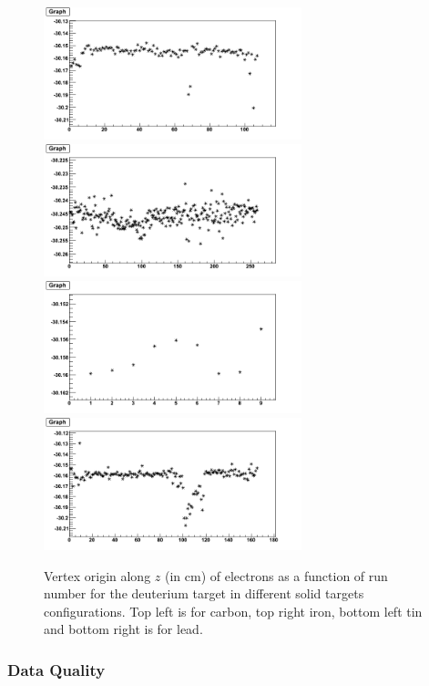 \begin{figure}[tbp]
\centering
\includegraphics[width=7.5cm] {answer-fig/VertexDeutC.png} 
\includegraphics[width=7.5cm] {answer-fig/VertexDeutFe.png} 
\includegraphics[width=7.5cm] {answer-fig/VertexDeutSn.png} 
\includegraphics[width=7.5cm] {answer-fig/VertexDeutPb.png} 
\caption {Vertex origin along $z$ (in cm) of electrons as a function of run 
number for the deuterium target in different solid targets configurations.
Top left is for carbon, top right iron, bottom left tin and bottom right is for lead.}
\label{VertexLiquid}
\end{figure}

\subsubsection{Data Quality}

